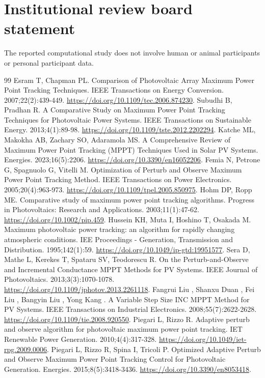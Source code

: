 \documentclass[Acad.Energy.,researcharticle,9pt,twoside,oneauthor]{Definitions/jams_academia}
\begin{document}
\section*{Institutional review board statement}
The reported computational study does not involve human or animal participants or personal participant data.
\begin{thebibliography}{99}
 Esram T, Chapman PL. Comparison of Photovoltaic Array Maximum Power Point Tracking Techniques. IEEE Transactions on Energy Conversion. 2007;22(2):439-449. \url{https://doi.org/10.1109/tec.2006.874230}.
 Subudhi B, Pradhan R. A Comparative Study on Maximum Power Point Tracking Techniques for Photovoltaic Power Systems. IEEE Transactions on Sustainable Energy. 2013;4(1):89-98. \url{https://doi.org/10.1109/tste.2012.2202294}.
 Katche ML, Makokha AB, Zachary SO, Adaramola MS. A Comprehensive Review of Maximum Power Point Tracking (MPPT) Techniques Used in Solar PV Systems. Energies. 2023;16(5):2206. \url{https://doi.org/10.3390/en16052206}.
 Femia N, Petrone G, Spagnuolo G, Vitelli M. Optimization of Perturb and Observe Maximum Power Point Tracking Method. IEEE Transactions on Power Electronics. 2005;20(4):963-973. \url{https://doi.org/10.1109/tpel.2005.850975}.
 Hohm DP, Ropp ME. Comparative study of maximum power point tracking algorithms. Progress in Photovoltaics: Research and Applications. 2003;11(1):47-62. \url{https://doi.org/10.1002/pip.459}.
 Hussein KH, Muta I, Hoshino T, Osakada M. Maximum photovoltaic power tracking: an algorithm for rapidly changing atmospheric conditions. IEE Proceedings - Generation, Transmission and Distribution. 1995;142(1):59. \url{https://doi.org/10.1049/ip-gtd:19951577}.
 Sera D, Mathe L, Kerekes T, Spataru SV, Teodorescu R. On the Perturb-and-Observe and Incremental Conductance MPPT Methods for PV Systems. IEEE Journal of Photovoltaics. 2013;3(3):1070-1078. \url{https://doi.org/10.1109/jphotov.2013.2261118}.
 Fangrui Liu , Shanxu Duan , Fei Liu , Bangyin Liu , Yong Kang . A Variable Step Size INC MPPT Method for PV Systems. IEEE Transactions on Industrial Electronics. 2008;55(7):2622-2628. \url{https://doi.org/10.1109/tie.2008.920550}.
 Piegari L, Rizzo R. Adaptive perturb and observe algorithm for photovoltaic maximum power point tracking. IET Renewable Power Generation. 2010;4(4):317-328. \url{https://doi.org/10.1049/iet-rpg.2009.0006}.
 Piegari L, Rizzo R, Spina I, Tricoli P. Optimized Adaptive Perturb and Observe Maximum Power Point Tracking Control for Photovoltaic Generation. Energies. 2015;8(5):3418-3436. \url{https://doi.org/10.3390/en8053418}.

\end{thebibliography}
\end{document}
